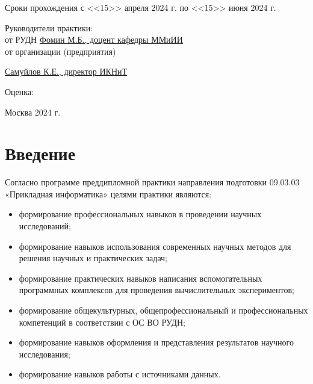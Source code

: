 \documentclass{article}
\begin{document}
\begin{titlepage}
    Сроки прохождения с <<15>> апреля 2024 г. по <<15>> июня 2024 г.

    \vspace*{\fill}

    \begin{adjustwidth}{0.4\textwidth}{0pt}
      Руководители практики:\\

      от РУДН \underline{Фомин М.Б., доцент  кафедры ММиИИ}\\

      от организации (предприятия)

      \underline{Самуйлов К.Е., директор ИКНиТ}
       
    \end{adjustwidth}
    \vspace{1em}
    
    Оценка: \underline{\phantom{1234567890 баллов}}

    \vspace*{\fill}
     
    \centering Москва 2024 г.
    \thispagestyle{empty} %
     
\end{titlepage}

    
    \newpage


\section{Введение}

Согласно программе преддипломной практики направления подготовки 09.03.03 «Прикладная информатика» целями практики являются:
\begin{itemize}
\item формирование профессиональных навыков в проведении научных исследований;
\item формирование навыков использования современных научных методов для решения научных и практических задач;
\item формирование практических навыков написания вспомогательных программных комплексов для проведения вычислительных экспериментов;
\item формирование общекультурных, общепрофессиональный и профессиональных компетенций в соответствии с ОС ВО РУДН;
\item формирование навыков оформления и представления результатов научного исследования;
\item формирование навыков работы с источниками данных.
\end{itemize}
\end{document}

